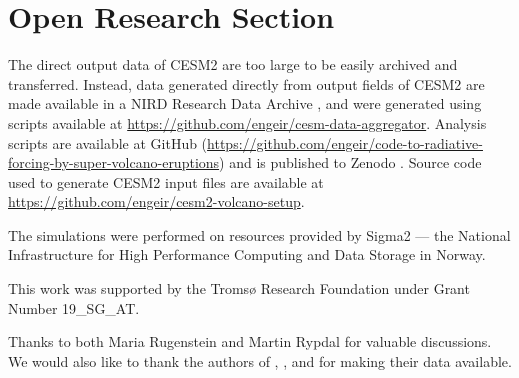 \documentclass[draft]{agujournal2019}
\begin{document}
  \section*{Open Research Section}


  The direct output data of CESM2 are too large to be easily archived and transferred.
  Instead, data generated directly from output fields of CESM2 are made available in a
  NIRD Research Data Archive \cite{enger2024:nirddataarchive}, and were generated using
  scripts available at \url{https://github.com/engeir/cesm-data-aggregator}. Analysis
  scripts are available at GitHub (\url{https://github.com/engeir/code-to-radiative-forcing-by-super-volcano-eruptions})
  and is published to Zenodo \cite{enger2024:code4paper1}. Source code used to generate
  CESM2 input files are available at
  \url{https://github.com/engeir/cesm2-volcano-setup}.

  \acknowledgments

  The simulations were performed on resources provided by Sigma2 --- the National
  Infrastructure for High Performance Computing and Data Storage in Norway.

  This work was supported by the Tromsø Research Foundation under Grant Number
  19\_SG\_AT.

  Thanks to both Maria Rugenstein and Martin Rypdal for valuable discussions. We would
  also like to thank the authors of , , and
   for making their data available.

  
\end{document}
